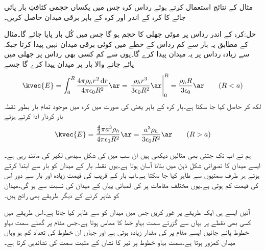 مثال  کے نتائج استعمال کرتے ہوئے   رداس کرہ جس میں یکساں  حجمی کثافتِ بار پائی جائے کا کرہ کے اندر اور کرہ کے باہر برقی میدان  حاصل کریں۔

حل:کرہ کے اندر رداس  پر  موٹی جھلی کا حجم  ہو گا جس میں کُل  بار پایا جائے گا۔مثال   کے مطابق یہ بار  سے کم رداس کے خطے میں کوئی برقی میدان نہیں پیدا کرتا جبکہ  سے زیادہ رداس پر یہ میدان پیدا کرے گا۔یوں  سے کم کسی بھی رداس پر جھلی میں پائے جانے والا بار  پر میدان پیدا کرے گا جسے
\begin{align}
\kvec{E}=\int_0^{R} \frac{4\pi \rho_h r^2 \dif r}{4\pi \epsilon_0 R^2} \ar=\left. \frac{\rho_h r^3}{3\epsilon_0 R^2} \ar\right|_0^R=\frac{\rho_h R}{3\epsilon_0}\ar \quad \quad (R<a)
\end{align}
لکھ کر حاصل کیا جا سکتا ہے۔بار کرہ کے باہر یعنی  کی صورت میں کرہ میں موجود تمام بار بطور نقطہ بار کردار ادا کرتے ہوئے
\begin{align}
\kvec{E}=\frac{\frac{4}{3} \pi a^3 \rho_h}{4\pi \epsilon_0 R^2}\ar=\frac{ a^3 \rho_h}{3\epsilon_0 R^2}\ar  \quad \quad (R>a)
\end{align}

ہم نے اب تک جتنی بھی مثالیں دیکھی ہیں ان سب میں  کی شکل سیدھی لکیر کی مانند رہی ہے۔ایسے میدان کا تصوراتی شکل ذہن میں بنانا آسان ہوتا ہے۔یوں نقطہ بار کے میدان کو بار سے ابتدا کرتے ہوئے ہر طرف سمتیوں سے ظاہر کیا جا سکتا ہے۔اب بار کے قریب  کی قیمت زیادہ اور بار سے دور اس کی قیمت کم ہوتی ہے۔یوں مختلف مقامات پر  کی لمبائی یہاں کے میدان کی نسبت سے ہو گی۔میدان کو ظاہر کرنے کے دیگر طریقے بھی رائج ہیں۔

آئیں ایسے ہی ایک طریقے پر غور کریں جس میں میدان کو  سے ظاہر کیا جاتا ہے۔اس طریقے میں کسی بھی نقطے  پر  یہاں سے گزرتے سمت بہاو خط کا مماس ہوتا ہے۔جس مقام پر گھنے سمت بہاو خطوط  پائے جائیں ایسے مقام پر  کی مقدار زیادہ ہوتی ہے اور جہاں ان خطوط کی تعداد کم ہو وہاں میدان کمزور ہوتا ہے۔سمت بہاو خطوط پر تیر کا نشان  کے مثبت سمت کی نشاندہی کرتا ہے۔
 
